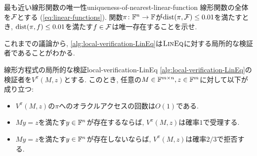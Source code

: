 \begin{exercise}{最も近い線形関数の唯一性}{uniqueness-of-nearest-linear-function}
  線形関数の全体を$\mathcal{F}$とする (\cref{eq:linear-functions}).
  関数$\pi\colon\mathbb{F}^n\to \mathbb{F}$が$\mathrm{dist}(\pi,\mathcal{F}) \le 0.01$を満たすとき,
  $\mathrm{dist}(\pi,f)\le 0.01$を満たす$f\in\mathcal{F}$は唯一存在することを示せ.
\end{exercise}

これまでの議論から, \cref{alg:local-verification-LinEq}は$\textsc{LinEq}$に対する局所的な検証者であることがわかる.

\begin{theorem}{線形方程式の局所的な検証}{local-verification-LinEq}
  \cref{alg:local-verification-LinEq}の検証者を$V^\pi(M,z)$とする.
  このとき, 任意の$M\in\mathbb{F}^{m\times n},z\in\mathbb{F}^m$に対して以下が成り立つ:
  \begin{itemize}
    \item $V^\pi(M,z)$の$\pi$へのオラクルアクセスの回数は$O(1)$である.
    \item $My=z$を満たす$y\in\mathbb{F}^n$が存在するならば, $V^\pi(M,z)$は確率$1$で受理する.
    \item $My=z$を満たす$y\in\mathbb{F}^n$が存在しないならば, $V^\pi(M,z)$は確率$2/3$で拒否する.
  \end{itemize}
\end{theorem}
